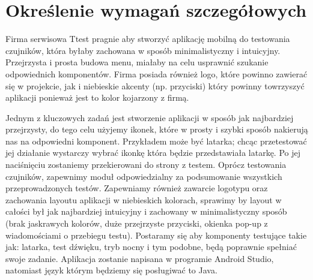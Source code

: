 \newpage
\section{Określenie wymagań szczegółowych}		%

\hspace{0.60cm}Firma serwisowa Ttest pragnie aby stworzyć aplikację mobilną do testowania czujników, która byłaby zachowana w sposób minimalistyczny i intuicyjny. Przejrzysta i prosta budowa menu, miałaby na celu usprawnić szukanie odpowiednich komponentów. Firma posiada również logo, które powinno zawierać się w projekcie, jak i niebieskie akcenty (np. przyciski) który powinny towrzyszyć aplikacji ponieważ jest to kolor kojarzony z firmą. \newline

Jednym z kluczowych zadań jest stworzenie aplikacji w sposób jak najbardziej przejrzysty, do tego celu użyjemy ikonek, które w prosty i szybki sposób nakierują nas na odpowiedni komponent. Przykładem może być latarka; chcąc przetestować jej działanie wystarczy wybrać ikonkę która będzie przedstawiała latarkę. Po jej naciśnięciu zostaniemy przekierowani do strony z testem. Oprócz testowania czujników, zapewnimy moduł odpowiedzialny za podsumowanie wszystkich przeprowadzonych testów. Zapewniamy również zawarcie logotypu oraz zachowania layoutu aplikacji w niebieskich kolorach, sprawimy by layout w całości był jak najbardziej intuicyjny i zachowany w minimalistyczny sposób (brak jaskrawych kolorów, duże przejrzyste przyciski, okienka pop-up z wiadomościami o przebiegu testu). Postaramy się aby komponenty testujące takie jak: latarka, test dźwięku, tryb nocny i tym podobne, będą poprawnie spełniać swoje zadanie. Aplikacja zostanie napisana w programie Android Studio, natomiast język którym będziemy się posługiwać to Java. \newline 

